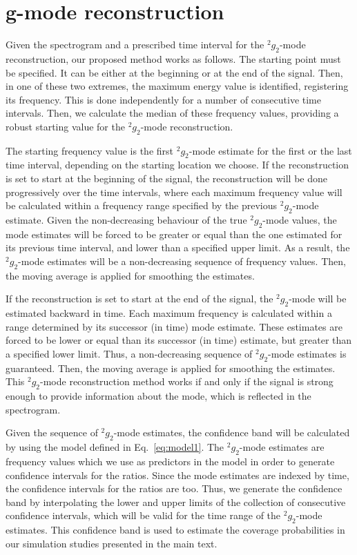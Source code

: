 \section{g-mode reconstruction}
\label{app:gmode}
Given the spectrogram and a prescribed time interval for the $^2g_2$-mode reconstruction, our proposed method works as follows.  The starting point must be specified.  It can be either at the beginning or at the end of the signal.  Then, in one of these two extremes, the maximum energy value is identified, registering its frequency.  This is done independently for a number of consecutive time intervals.  Then, we calculate the median of these frequency values, providing a robust starting value for the $^2g_2$-mode reconstruction.

The starting frequency value is the first $^2g_2$-mode estimate for the first or the last time interval, depending on the starting location we choose.  If the reconstruction is set to start at the beginning of the signal, the reconstruction will be done progressively over the time intervals, where each maximum frequency value will be calculated within a frequency range specified by the previous $^2g_2$-mode estimate.  Given the non-decreasing behaviour of the true $^2g_2$-mode values, the mode estimates will be forced to be greater or equal than the one estimated for its previous time interval, and lower than a specified upper limit.  As a result, the $^2g_2$-mode estimates will be a non-decreasing sequence of frequency values. Then, the moving average is applied for smoothing the estimates.

If the reconstruction is set to start at the end of the signal, the $^2g_2$-mode will be estimated backward in time.  Each maximum frequency is calculated within a range determined by its successor (in time) mode estimate.  These estimates are forced to be lower or equal than its successor (in time) estimate, but greater than a specified lower limit. Thus, a non-decreasing sequence of $^2g_2$-mode estimates is guaranteed.  Then, the moving average is applied for smoothing the estimates. This $^2g_2$-mode reconstruction method works if and only if the signal is strong enough to provide information about the mode, which is reflected in the spectrogram.


Given the sequence of $^2g_2$-mode estimates, the confidence band will be calculated by using the model defined in Eq.~\eqref{eq:model1}. The $^2g_2$-mode estimates are frequency values which we use as predictors in the model in order to generate confidence intervals for the ratios. Since the mode estimates are indexed by time, the confidence intervals for the ratios are too.  Thus, we generate the confidence band by interpolating the lower and upper limits of the collection of consecutive confidence intervals, which will be valid for the time range of the $^2g_2$-mode estimates.  This confidence band is used to estimate the coverage probabilities in our simulation studies presented in the main text.  

